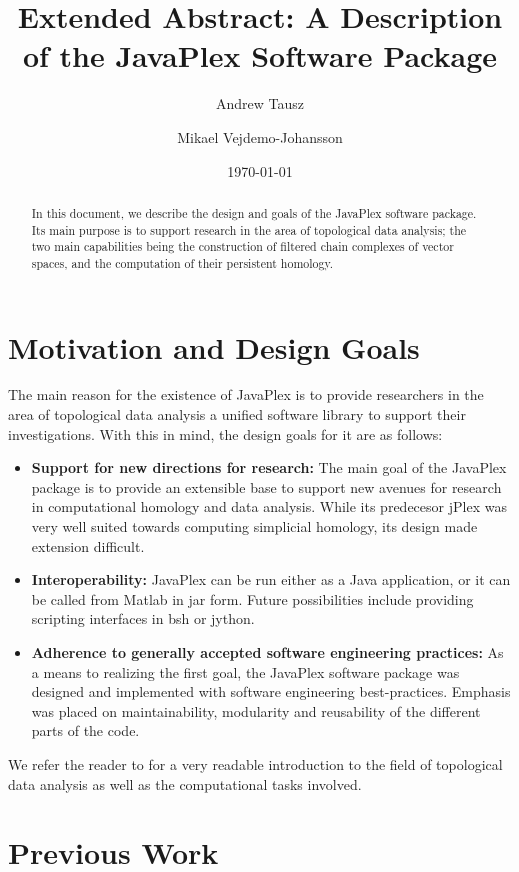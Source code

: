 \documentclass[10pt]{article}
\title{Extended Abstract: A Description of the JavaPlex Software Package}
\author{Andrew Tausz}
\author{Mikael Vejdemo-Johansson}
\affil{Stanford University}
\date{\today}
\begin{document}
\maketitle

\begin{abstract}
In this document, we describe the design and goals of the JavaPlex software package. Its main purpose is to support research in the area of topological data analysis; the two main capabilities being the construction of filtered chain complexes of vector spaces, and the computation of their persistent homology.
\end{abstract}

\section{Motivation and Design Goals}

The main reason for the existence of JavaPlex is to provide researchers in the area of topological data analysis a unified software library to support their investigations. With this in mind, the design goals for it are as follows:

\begin{itemize}
\item {\bf Support for new directions for research: } The main goal of the JavaPlex package is to provide an extensible base to support new avenues for research in computational homology and data analysis. While its predecesor jPlex was very well suited towards computing simplicial homology, its design made extension difficult.
\item {\bf Interoperability: } JavaPlex can be run either as a Java application, or it can be called from Matlab in jar form. Future possibilities include providing scripting interfaces in bsh or jython.
\item {\bf Adherence to generally accepted software engineering practices: } As a means to realizing the first goal, the JavaPlex software package was designed and implemented with software engineering best-practices. Emphasis was placed on maintainability, modularity and reusability of the different parts of the code.
\end{itemize}

We refer the reader to \cite{Carlsson_09} for a very readable introduction to the field of topological data analysis as well as the computational tasks involved.

\section{Previous Work}
\end{document}
